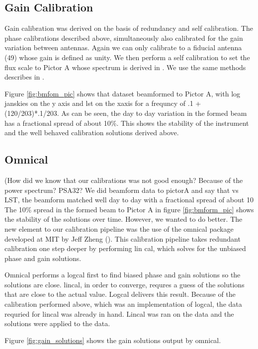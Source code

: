 \documentclass[twocolumn,numberedappendix]{emulateapj}
\begin{document}
\subsection{Gain Calibration}
Gain calibration was derived on the basis of redundancy and self calibration.
The phase calibrations described above, simultaneously also calibrated for the
gain variation between antennas. Again we can only calibrate to a fiducial
antenna (49) whose gain is defined as unity. We then perform a self calibration
to set the flux scale to Pictor A whose spectrum is derived in
\citep{jacops_2013}. We use the same methods describes in \citep{Parsons 2014}.

Figure \ref{fig:bmfom_pic} shows that dataset beamformed to Pictor A, with log
janskies on the y axis and lst on the xaxis for a frequncy of .1 + (120/203)*.1/203. 
As can be seen, the day to day variation in the formed beam has a fractional
spread of about 10$\%$.  This shows the stability of the instrument and the well
behaved calibration solutions derived above. 

\subsection{Omnical}
(How did we know that our calibrations was not good enough? Because of the power
spectrum? PSA32? We did beamform data to pictorA and say that vs LST, the
beamform matched well day to day with a fractional spread of about 10%
The 10$\%$ spread in the formed beam to Pictor A in figure \ref{fig:bmform_pic}
shows the stability of the solutions over time. However, we wanted to do better. 
The new element to our calibration pipeline was the use of the omnical package
developed at MIT by Jeff Zheng (\citep{zheng_et_al2014}). This calibration
pipeline takes redundant calibration one step deeper by performing lin cal,
which solves for the unbiased phase and gain solutions.  

Omnical performs a logcal first to find biased phase and gain solutions so the
solutions are close. lincal, in order to converge, requres a guess of the
solutions that are close to the actual value. Logcal delivers this result.
Because of the calibration performed above, which was an implementation of
logcal, the data requried for lincal was already in hand. Lincal was ran on the
data and the solutions were applied to the data.

Figure \ref{fig:gain_solutions} shows the gain solutions output by omnical. 
%
\end{document}
